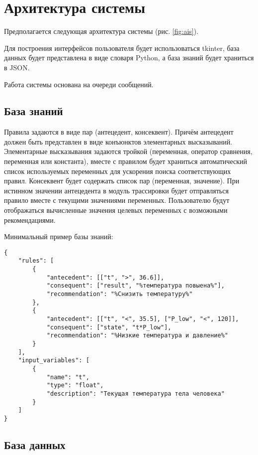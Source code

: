 \section{Архитектура системы}

Предполагается следующая архитектура системы (рис. \ref{fig:ais}).


Для построения интерфейсов пользователя будет использоваться tkinter, база данных будет представлена в виде словаря Python, а база знаний будет храниться в JSON.

Работа системы основана на очереди сообщений.

\subsection{База знаний}

Правила задаются в виде пар (антецедент, консеквент).
Причём антецедент должен быть представлен в виде конъюнктов элементарных высказываний.
Элементарные высказывания задаются тройкой (переменная, оператор сравнения, переменная или константа),
вместе с правилом будет храниться автоматический список используемых переменных для ускорения поиска соответствующих правил.
Консеквент будет содержать список пар (переменная, значение).
При истинном значении антецедента в модуль трассировки будет отправляться правило вместе с текущими значениями переменных.
Пользователю будут отображаться вычисленные значения целевых переменных с возможными рекомендациями.

Минимальный пример базы знаний:


\begin{lstlisting}
{
	"rules": [
		{
			"antecedent": [["t", ">", 36.6]],
			"consequent": ["result", "%температура повыена%"],
			"recommendation": "%Снизить температуру%"
		},
		{
			"antecedent": [["t", "<", 35.5], ["P_low", "<", 120]],
			"consequent": ["state", "t*P_low"],
			"recommendation": "%Низкие температура и давление%"
		}
	],
	"input_variables": [
		{
			"name": "t",
			"type": "float",
			"description": "Текущая температура тела человека"
		}
	]
}
\end{lstlisting}

\subsection{База данных}

